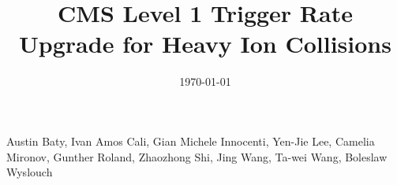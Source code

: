 \begin{titlepage}
\vspace{-.2 cm} 
\date{\today}
\vspace{2 cm}
\title{CMS Level 1 Trigger Rate Upgrade for Heavy Ion Collisions}

\vspace{.2 cm} 
\begin{Authlist}
Austin Baty\footnotemark[1], 
Ivan Amos Cali\footnotemark[1],
Gian Michele Innocenti\footnotemark[1], 
Yen-Jie Lee\footnotemark[1], 
Camelia Mironov\footnotemark[1], 
Gunther Roland\footnotemark[1], 
Zhaozhong Shi\footnotemark[1], 
Jing Wang\footnotemark[1], 
Ta-wei Wang\footnotemark[1], 
Boleslaw Wyslouch\footnotemark[1]
\end{Authlist}



\end{titlepage}





